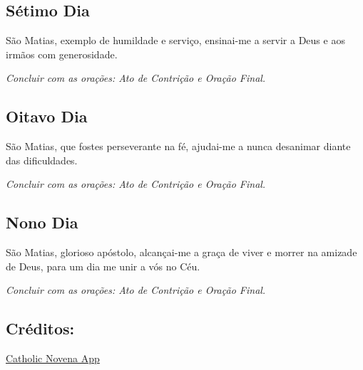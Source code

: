 \documentclass[18pt]{article}
\begin{document}
\subsection*{Sétimo Dia}
São Matias, exemplo de humildade e serviço, ensinai-me a servir a Deus e aos irmãos com generosidade.

\textit{Concluir com as orações: Ato de Contrição e Oração Final.}

\subsection*{Oitavo Dia}
São Matias, que fostes perseverante na fé, ajudai-me a nunca desanimar diante das dificuldades.

\textit{Concluir com as orações: Ato de Contrição e Oração Final.}

\subsection*{Nono Dia}
São Matias, glorioso apóstolo, alcançai-me a graça de viver e morrer na amizade de Deus, para um dia me unir a vós no Céu.

\textit{Concluir com as orações: Ato de Contrição e Oração Final.}

\vfill

\subsection*{Créditos:}
\href{https://catholicnovenaapp.com/saints/about-st-matthias-apostle/}{Catholic Novena App}
\end{document}
